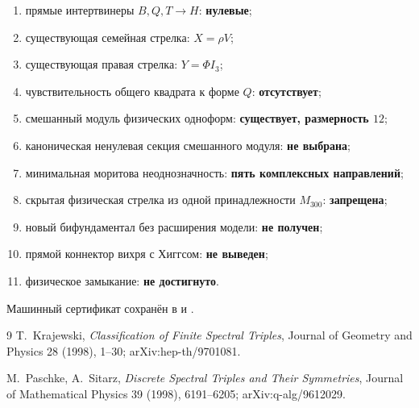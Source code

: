 \begin{protocol}
\begin{enumerate}
 \item прямые интертвинеры $B,Q,T\to H$: \textbf{нулевые};
 \item существующая семейная стрелка: \textbf{$X=\rho V$};
 \item существующая правая стрелка: \textbf{$Y=\Phi I_3$};
 \item чувствительность общего квадрата к форме $Q$:
 \textbf{отсутствует};
 \item смешанный модуль физических одноформ:
 \textbf{существует, размерность $12$};
 \item каноническая ненулевая секция смешанного модуля:
 \textbf{не выбрана};
 \item минимальная моритова неоднозначность:
 \textbf{пять комплексных направлений};
 \item скрытая физическая стрелка из одной принадлежности $M_{300}$:
 \textbf{запрещена};
 \item новый бифундаментал без расширения модели:
 \textbf{не получен};
 \item прямой коннектор вихря с Хиггсом:
 \textbf{не выведен};
 \item физическое замыкание: \textbf{не достигнуто}.
\end{enumerate}
\end{protocol}

Машинный сертификат сохранён в
и
.

\begin{thebibliography}{9}
T.~Krajewski,
\emph{Classification of Finite Spectral Triples},
Journal of Geometry and Physics 28 (1998), 1--30;
arXiv:hep-th/9701081.

M.~Paschke, A.~Sitarz,
\emph{Discrete Spectral Triples and Their Symmetries},
Journal of Mathematical Physics 39 (1998), 6191--6205;
arXiv:q-alg/9612029.
\end{thebibliography}